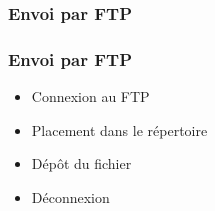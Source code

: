 \subsubsection{Envoi par FTP}

\begin{frame}
	\frametitle{Envoi par FTP}
	
	\begin{itemize}
		\item Connexion au FTP\sautligne
		
		\item Placement dans le répertoire\sautligne		
		
		\item Dépôt du fichier\sautligne
		
		\item Déconnexion
	\end{itemize}
\end{frame}

